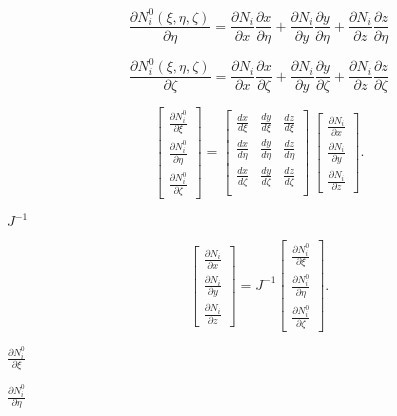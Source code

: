 \documentclass{article}
\begin{document}
\[ \frac{\partial N^0_i(\xi, \eta, \zeta)}{\partial \eta} = \frac{\partial
N_i}{\partial x} \frac{\partial x}{\partial \eta} + \frac{\partial
N_i}{\partial y} \frac{\partial y}{\partial \eta} + \frac{\partial
N_i}{\partial z} \frac{\partial z}{\partial \eta} \]
\pagebreak

\[ \frac{\partial N^0_i(\xi, \eta, \zeta)}{\partial \zeta} =
\frac{\partial
N_i}{\partial x} \frac{\partial x}{\partial \zeta} + \frac{\partial
N_i}{\partial y} \frac{\partial y}{\partial \zeta} + \frac{\partial
N_i}{\partial z} \frac{\partial z}{\partial \zeta} \]
\pagebreak

\[ \left[ {\begin{array}{c} \frac{\partial N^0_i}{\partial \xi} \\
\frac{\partial N^0_i}{\partial \eta} \\
\frac{\partial N^0_i}{\partial \zeta} \end{array}}\right] =
\left[ {
\begin{array}{ccc}
\frac{dx}{d\xi} &\frac{dy}{d\xi} &\frac{dz}{d\xi} \\
\frac{dx}{d\eta} & \frac{dy}{d\eta} &\frac{dz}{d\eta} \\
\frac{dx}{d\zeta} & \frac{dy}{d\zeta} &\frac{dz}{d\zeta} \\
\end{array}
} \right] \, \left[ {\begin{array}{c} \frac{\partial
N_i}{\partial x} \\
\frac{\partial N_i}{\partial y} \\
\frac{\partial N_i}{\partial z}\end{array}}\right]. \]
\pagebreak

$ J^{-1} $
\pagebreak

\[ \left[ {\begin{array}{c}
\frac{\partial
N_i}{\partial x} \\
\frac{\partial N_i}{\partial y} \\
\frac{\partial N_i}{\partial z}\end{array}}\right] = J^{-1}
\left[ {\begin{array}{c} \frac{\partial N^0_i}{\partial \xi} \\
\frac{\partial N^0_i}{\partial \eta} \\
\frac{\partial N^0_i}{\partial \zeta}\end{array}}\right]. \]
\pagebreak

$ \frac{\partial
N^0_i}{ \partial \xi} $
\pagebreak

$ \frac{\partial N^0_i} {\partial \eta }
$
\pagebreak
\end{document}
